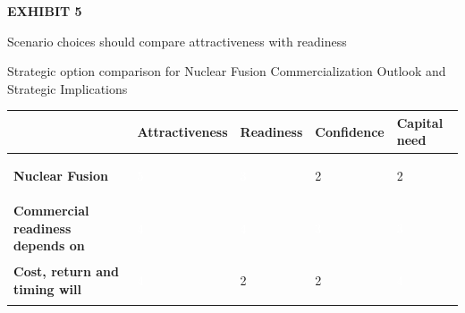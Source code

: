 \documentclass[10pt,a4paper]{article}
\begin{document}
\clearpage
{\textcolor{BOGreen}{\scriptsize\bfseries EXHIBIT 5}}\par\vspace{3pt}
{\sffamily\fontsize{15}{19}\selectfont\color{BONavy} Scenario choices should compare attractiveness with readiness}\par
{\small\color{BOText} Strategic option comparison for Nuclear Fusion Commercialization Outlook and Strategic Implications}\par\vspace{4pt}
{\scriptsize\begin{tabular}{p{38mm}>{\centering\arraybackslash}p{21mm}>{\centering\arraybackslash}p{21mm}>{\centering\arraybackslash}p{21mm}>{\centering\arraybackslash}p{21mm}}
 & {\bfseries Attractiveness} & {\bfseries Readiness} & {\bfseries Confidence} & {\bfseries Capital need} \\
\hline
{\bfseries Nuclear Fusion} & \colorbox{BOGreen}{\textcolor{white}{\strut\hspace{5pt}5\hspace{5pt}}} & \colorbox{BOBlue}{\textcolor{white}{\strut\hspace{5pt}3\hspace{5pt}}} & \colorbox{BOLight}{\textcolor{BOText}{\strut\hspace{5pt}2\hspace{5pt}}} & \colorbox{BOLight}{\textcolor{BOText}{\strut\hspace{5pt}2\hspace{5pt}}} \\
{\bfseries Commercial readiness depends on} & \colorbox{BOGreen}{\textcolor{white}{\strut\hspace{5pt}4\hspace{5pt}}} & \colorbox{BOGreen}{\textcolor{white}{\strut\hspace{5pt}4\hspace{5pt}}} & \colorbox{BOBlue}{\textcolor{white}{\strut\hspace{5pt}3\hspace{5pt}}} & \colorbox{BOBlue}{\textcolor{white}{\strut\hspace{5pt}3\hspace{5pt}}} \\
{\bfseries Cost, return and timing will} & \colorbox{BOGreen}{\textcolor{white}{\strut\hspace{5pt}4\hspace{5pt}}} & \colorbox{BOLight}{\textcolor{BOText}{\strut\hspace{5pt}2\hspace{5pt}}} & \colorbox{BOLight}{\textcolor{BOText}{\strut\hspace{5pt}2\hspace{5pt}}} & \colorbox{BOGreen}{\textcolor{white}{\strut\hspace{5pt}4\hspace{5pt}}} \\

\end{tabular}}
\end{document}
